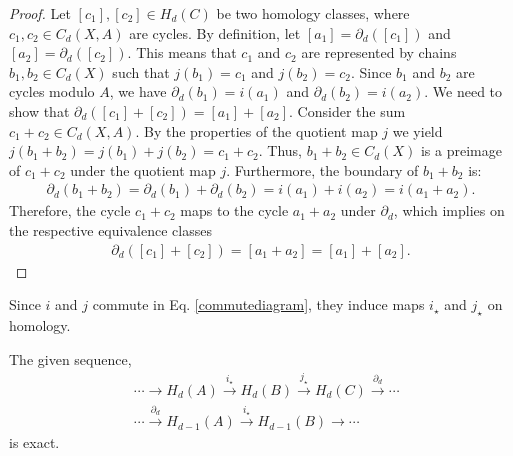 \begin{proof}
	Let \([c_{1}], [c_{2}] \in H_{d}(C)\) be two homology classes, where \(c_{1}, c_{2} \in C_{d}(X, A)\) are cycles. By definition, let \([a_{1}] = \partial_{d}([c_{1}])\) and \([a_{2}] = \partial_{d}([c_{2}])\). This means that \(c_{1}\) and \(c_{2}\) are represented by chains \(b_{1}, b_{2} \in C_{d}(X)\) such that \(j(b_{1}) = c_{1}\) and \(j(b_{2}) = c_{2}\). Since \(b_{1}\) and \(b_{2}\) are cycles modulo \(A\), we have $\partial_{d}(b_{1}) = i(a_{1})$ and $\partial_{d}(b_{2}) = i(a_{2})$. We need to show that $\partial_{d}([c_{1}] + [c_{2}]) = [a_{1}] + [a_{2}]$. Consider the sum \(c_{1} + c_{2} \in C_{d}(X, A)\). By the properties of the quotient map \(j\) we yield $j(b_{1} + b_{2}) = j(b_{1}) + j(b_{2}) = c_{1} + c_{2}$. Thus, \(b_{1} + b_{2} \in C_{d}(X)\) is a preimage of \(c_{1} + c_{2}\) under the quotient map \(j\). Furthermore, the boundary of \(b_{1} + b_{2}\) is:
	\begin{align}
		\partial_{d}(b_{1} + b_{2}) = \partial_{d}(b_{1}) + \partial_{d}(b_{2}) = i(a_{1}) + i(a_{2}) = i(a_{1} + a_{2}). 
	\end{align}
	Therefore, the cycle \(c_{1} + c_{2}\) maps to the cycle \(a_{1} + a_{2}\) under \(\partial_{d}\), which implies on the respective equivalence classes
	\begin{align}
		\partial_{d}([c_{1}] + [c_{2}]) = [a_{1} + a_{2}] = [a_{1}] + [a_{2}]. 
	\end{align}
\end{proof}

Since $i$ and $j$ commute in Eq. \ref{commutediagram}, they induce maps $i_\star$ and $j_\star$ on homology.

\begin{lemma}{\cite[Theorem 2.16]{hatcher2005algebraic}}
	\label{exacthomsequence}
	The given sequence,
	\begin{align}
		  & \cdots \rightarrow H_{d}(A) \xrightarrow{i_\star} H_{d}(B) \xrightarrow{j_\star} H_{d}(C) \xrightarrow{\partial_d} \cdots \nonumber\\
		  & \cdots \xrightarrow{\partial_d} H_{d-1}(A) \xrightarrow{i_\star} H_{d-1}(B) \rightarrow \cdots                            
	\end{align}
	is exact.
\end{lemma}

